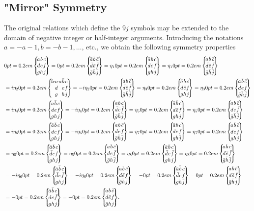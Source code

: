 \subsection{"Mirror" Symmetry}\label{sec:10.4.3}
The original relations which define the $9 j$ symbols may be extended to the domain of negative integer or half-integer arguments. Introducing the notations $a=-a-1, b=-b-1, \ldots$, etc., we obtain the following symmetry properties \cite{ref045}
\begin{align}
&\ninej{a }{ b }{ c }{d }{ e }{ f }{g }{ h }{ j}
=\ninej{\bar{a} }{\bar b }{\bar c }{\bar d }{\bar e }{\bar f }{\bar g }{\bar h }{\bar j}
=\eta_{1}\ninej{\bar a }{ b }{ c }{d }{ e }{ f }{g }{ h }{ j}
=\eta_{1}\ninej{a }{\bar b }{\bar c }{\bar d }{\bar e }{\bar f }{\bar g }{\bar h }{\bar j}  \notag\\
&=i \eta_{2}\ninej{bar{a}}{\bar{b}}{c}{d}{e}{f}{g}{h}{j}
=-i \eta_{2}\ninej{a }{ b }{\bar c }{\bar d }{\bar e }{\bar f }{\bar g }{\bar h }{\bar j}
=\eta_{3}\ninej{\bar a }{ b }{ c }{d }{\bar e }{ f }{g }{ h }{ j}
=\eta_{3}\ninej{a }{\bar b }{\bar c }{\bar d }{ e }{\bar f }{\bar g }{\bar h }{\bar j}  \notag\\
&=i \eta_{4}\ninej{\bar a }{\bar b }{\bar c }{d }{ e }{ f }{g }{ h }{ j}
=-i \eta_{4}\ninej{a }{ b }{ c }{\bar d }{\bar e }{\bar f }{\bar g }{\bar h }{\bar j}
=\eta_{5}\ninej{\bar a }{\bar b }{ c }{\bar d }{\bar e }{ f }{g }{ h }{ j}
=\eta_{5}\ninej{a }{ b }{\bar c }{d }{ e }{\bar f }{\bar g }{\bar h }{\bar j}  \notag\\
&=i \eta_{6}\ninej{\bar a }{\bar b }{ c }{\bar d }{ e }{\bar f }{g }{ h }{ j}=-i \eta_{6}\ninej{a }{ b }{\bar c }{d }{\bar e }{ f }{\bar g }{\bar h }{\bar j}=\eta_{7}\ninej{\bar a }{ b }{ c }{d }{\bar e }{ f }{g }{ h }{\bar j}
=\eta_{7}\ninej{a }{\bar b }{\bar c }{\bar d }{ e }{\bar f }{g }{ h }{ j}  \notag\\
&=\eta_{5}\ninej{\bar a }{\bar b }{ c }{\bar d }{\bar e }{ f }{g }{ h }{ j}
=\eta_{5}\ninej{a }{ b }{\bar c }{d }{ e }{\bar f }{\bar g }{\bar h }{\bar j}
=\eta_{8}\ninej{\bar a }{\bar b }{ c }{\bar d }{ e }{\bar f }{g }{ h }{ j}
=\eta_{8}\ninej{a }{ b }{ c }{d }{\bar e }{\bar f }{\bar g }{\bar h }{\bar j}  \notag\\
&=-i \eta_{6}\ninej{\bar a }{\bar b }{ c }{\bar d }{ e }{\bar f }{g }{ h }{ j}=-i \eta_{6}\ninej{a }{ b }{\bar c }{d }{ \bar e }{ f }{\bar g }{\bar h }{\bar j}
=-\ninej{\bar a }{\bar  b }{ c }{\bar d }{ e }{ f }{g }{ h }{\bar j}
=\ninej{a }{ b }{\bar c }{d }{\bar e }{\bar f }{\bar g }{\bar h }{\bar j}  \notag\\
&=-\ninej{\bar a }{\bar b }{ c }{d }{ e }{\bar f }{g }{ h }{\bar j}=-\ninej{a }{ b }{\bar c }{\bar d }{\bar e }{\bar f }{\bar g }{\bar h }{ j} . \label{eq:10:4:10}
\end{align}
